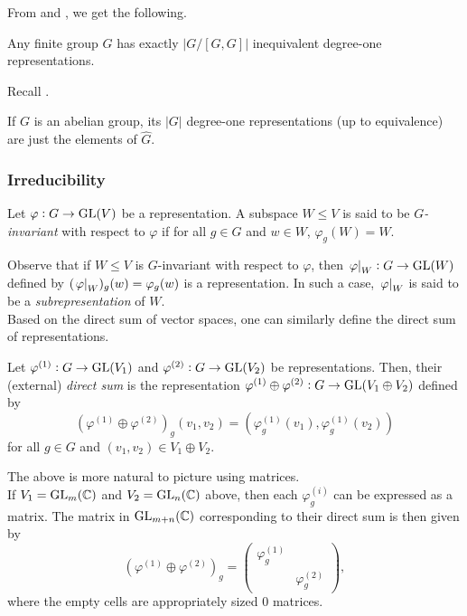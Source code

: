 			From  and , we get the following.

			\begin{corollary}
				\label{cor: number of degree one reps}
				Any finite group $G$ has exactly $|G/[G,G]|$ inequivalent degree-one representations.
			\end{corollary}

			Recall .

			\begin{fcor}
				\label{cor: deg one reps of abelian group}
				If $G$ is an abelian group, its $|G|$ degree-one representations (up to equivalence) are just the elements of $\hat{G}$.
			\end{fcor}

		\subsubsection{Irreducibility}

			\begin{fdef}
				Let $\varphi : G \to \operatorname{GL}(V)$ be a representation. A subspace $W \le V$ is said to be \emph{$G$-invariant} with respect to $\varphi$ if for all $g \in G$ and $w \in W$, $\varphi_g(W) = W$.
			\end{fdef}

			Observe that if $W\le V$ is $G$-invariant with respect to $\varphi$, then $\left.\varphi\right|_{W} : G \to \operatorname{GL}(W)$ defined by $(\left.\varphi\right|_{W})_g(w) = \varphi_g(w)$ is a representation. In such a case, $\left.\varphi\right|_{W}$ is said to be a \emph{subrepresentation} of $W$.\\
			Based on the direct sum of vector spaces, one can similarly define the direct sum of representations.

			\begin{fdef}
				Let $\varphi^{(1)} : G \to \operatorname{GL}(V_1)$ and $\varphi^{(2)} : G \to \operatorname{GL}(V_2)$ be representations. Then, their (external) \emph{direct sum} is the representation $\varphi^{(1)} \oplus \varphi^{(2)} : G \to \operatorname{GL}(V_1 \oplus V_2)$ defined by
				\[ \left(\varphi^{(1)} \oplus \varphi^{(2)}\right)_g(v_1,v_2) = (\varphi^{(1)}_g(v_1), \varphi^{(1)}_g(v_2)) \]
				for all $g \in G$ and $(v_1,v_2) \in V_1 \oplus V_2$.
			\end{fdef}

			The above is more natural to picture using matrices.\\
			If $V_1 = \operatorname{GL}_m(\mathbb{C})$ and $V_2 = \operatorname{GL}_n(\mathbb{C})$ above, then each $\varphi^{(i)}_g$ can be expressed as a matrix. The matrix in $\operatorname{GL}_{m+n}(\mathbb{C})$ corresponding to their direct sum is then given by
			\[ \left( \varphi^{(1)} \oplus \varphi^{(2)} \right)_g = \begin{pmatrix} \varphi^{(1)}_g &  \\  & \varphi^{(2)}_g \end{pmatrix}, \]
			where the empty cells are appropriately sized $0$ matrices.\\
			
